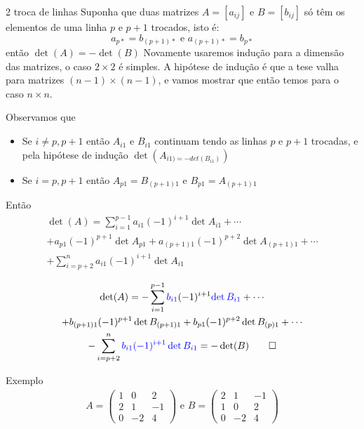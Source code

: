 \documentclass{beamer}
\begin{document}
\begin{frame}{2 troca de linhas}
  Suponha que duas matrizes $A=[a_{ij}]$ e $B=[b_{ij}]$ só têm os elementos de uma linha $p$ e $p+1$ trocados, isto
  é:
  $$ a_{p*}=b_{(p+1)*} \text { e } a_{(p+1)*} = b_{p*}$$
  então $\det(A)=-\det(B)$
  Novamente usaremos indução para a dimensão das matrizes,
  o caso $2 \times 2$ é simples. A hipótese de indução é que a tese 
  valha para matrizes $(n-1)\times (n-1)$, e vamos mostrar que 
  então temos para o caso $n\times n$.
\end{frame}
\begin{frame}{}
  Observamos que
  \begin{itemize}
    \item Se $i\neq p, p+1$ então $A_{i1}$ e $B_{i1}$ continuam tendo as linhas $p$ e $p+1$ trocadas, e pela hipótese de indução $\det(A_{i1)=-det(B_{i1})})$
    \item Se $ i=p,p+1 $ então $A_{p1}=B_{(p+1)1}$ e $B_{p1} = A_{(p+1)1}$
  \end{itemize}
  Então 
  \begin{gather*}\det(A) = \sum_{i=1}^{p-1}a_{i1}(-1)^{i+1}\det{A_{i1}} + \cdots \\
    +a_{p1}(-1)^{p+1}\det{A_{p1}} + a_{(p+1)1}(-1)^{p+2}\det{A_{(p+1)1}} + \cdots \\
  + \sum_{i=p+2}^{n}a_{i1}(-1)^{i+1}\det{A_{i1}}\end{gather*}
\end{frame}
 
\begin{frame}
  \begin{gather*}\det(A) = -\sum_{i=1}^{p-1}\textcolor{blue}{b_{i1}}(-1)^{i+1}\textcolor{blue}{\det{B_{i1}}} + \cdots \\
    +b_{(p+1)1}(-1)^{p+1}\det{B_{(p+1)1}} + b_{p1}(-1)^{p+2}\det{B_{(p)1}} + \cdots \\
  -\sum_{i=p+2}^{n}\textcolor{blue}{b_{i1}(-1)^{i+1}\det{B_{i1}}}=-\det(B) \qed \end{gather*}
\end{frame}

\begin{frame}{Exemplo}
  \begin{gather*}
    A =\begin{pmatrix}
      1 & 0 & 2 \\ 2 & 1 & -1 \\ 0 & -2 & 4 
    \end{pmatrix}\text{ e } B=\begin{pmatrix}
      2 & 1 & -1 \\ 
      1 & 0 & 2 \\ 
      0 & -2 & 4 
    \end{pmatrix}
  \end{gather*}
  
\end{frame}
\end{document}

